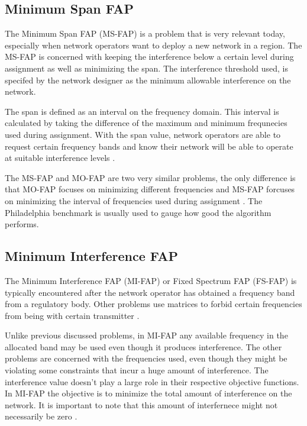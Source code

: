 \subsection{Minimum Span FAP}
The Minimum Span FAP (MS-FAP) is a problem that is very relevant today, especially when network operators want to deploy a new network in a region. The MS-FAP is concerned with keeping the interference below a certain level during assignment as well as minimizing the span. The interference threshold used, is specifed by the network designer as the minimum allowable interference on the network.

The span is defined as an interval on the frequency domain. This interval is calculated by taking the difference of the maximum and minimum frequnecies used during assignment. With the span value, network operators are able to request certain frequency bands and know their network will be able to operate at suitable interference levels \cite{Karen2004,MontemanniThesis,MSFAP}.

The MS-FAP and MO-FAP are two very similar problems, the only difference is that MO-FAP focuses on minimizing different frequencies and MS-FAP forcuses on minimizing the interval of frequencies used during assignment \cite{Karen2004}. The Philadelphia benchmark is usually used to gauge how good the algorithm performs.
\subsection{Minimum Interference FAP}
The Minimum Interference FAP (MI-FAP) or Fixed Spectrum FAP (FS-FAP) is typically encountered after the network operator has obtained a frequency band from a regulatory body. Other problems use matrices to forbid certain frequencies from being with certain transmitter \cite{Karen2004,Eisenblatter,MontemanniThesis,MultipleBinaryFAP}. 

Unlike previous discussed problems, in MI-FAP any available frequency in the allocated band may be used even though it produces interference. The other problems are concerned with the frequencies used, even though they might be violating some constraints that incur a huge amount of interference. The interference value doesn't play a large role in their respective objective functions. In MI-FAP the objective is to minimize the total amount of interference on the network. It is important to note that this amount of interfernece might not necessarily be zero \cite{Karen2004,Eisenblatter,MontemanniThesis,MultipleBinaryFAP}.

